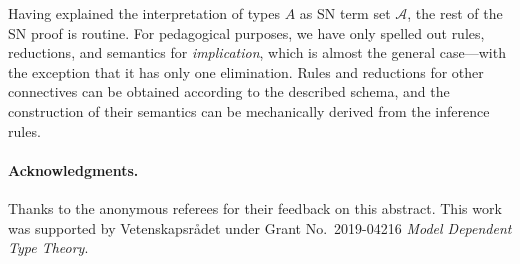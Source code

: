 \documentclass[a4paper]{easychair}
\newcommand{\A}{\mathcal{A}}
\begin{document}
Having explained the interpretation of types $A$ as SN term set $\A$,
the rest of the SN proof is routine.  For pedagogical purposes, we
have only spelled out rules, reductions, and semantics for
\emph{implication}, which is almost the general case---with the
exception that it has only one elimination.  Rules and reductions for
other connectives can be obtained according to the described schema,
and the construction of their semantics can be mechanically derived
from the inference rules.


\paragraph*{Acknowledgments.}
Thanks to the anonymous referees for their feedback on this abstract.
This work was supported by Vetenskapsr\aa{}det under Grant
No.~2019-04216 \emph{Model Dependent Type Theory}.



%


\end{document}
